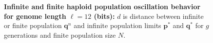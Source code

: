 \begin{figure}[H]
\begin{center}
{}\hspace{5pt}


\caption{\textbf{Infinite and finite haploid population oscillation behavior for genome length $\ell = 12$ (bits):} $d$ is
  distance between infinite or finite population ${\bm q}^n$ and infinite
  population limits ${{\bm p}^\ast}$ and ${{\bm q}^{\ast}}$ for $g$ generations and finite population size $N$.}
\label{oscillation_12h}
\end{center}
\end{figure}

